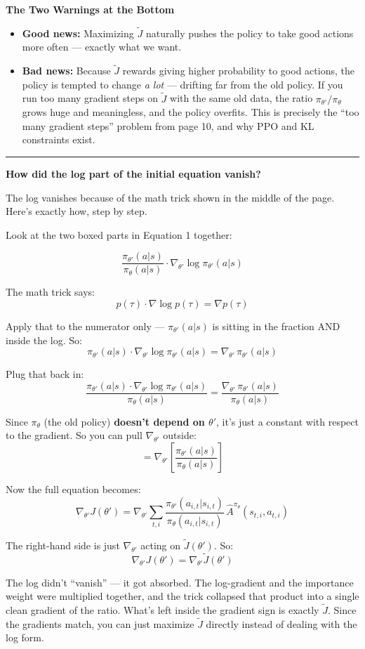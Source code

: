 \bigskip

\textbf{The Two Warnings at the Bottom}
\begin{itemize}
    \item \textbf{Good news:} Maximizing $\tilde{J}$ naturally pushes the policy to take good actions more often --- exactly what we want.
    \item \textbf{Bad news:} Because $\tilde{J}$ rewards giving higher probability to good actions, the policy is tempted to change \textit{a lot} --- drifting far from the old policy. If you run too many gradient steps on $\tilde{J}$ with the same old data, the ratio $\pi_{\theta'}/\pi_\theta$ grows huge and meaningless, and the policy overfits. This is precisely the ``too many gradient steps'' problem from page 10, and why PPO and KL constraints exist.
\end{itemize}

\bigskip
\hrule
\bigskip

\textbf{How did the log part of the initial equation vanish?}

The log vanishes because of the math trick shown in the middle of the page. Here's exactly how,
step by step.

Look at the two boxed parts in Equation 1 together:

\[
\frac{\pi_{\theta'}(a|s)}{\pi_\theta(a|s)} \cdot \nabla_{\theta'} \log \pi_{\theta'}(a|s)
\]

The math trick says:
\[
p(\tau) \cdot \nabla \log p(\tau) = \nabla p(\tau)
\]

Apply that to the numerator only --- $\pi_{\theta'}(a|s)$ is sitting in the fraction AND inside
the log. So:
\[
\pi_{\theta'}(a|s) \cdot \nabla_{\theta'} \log \pi_{\theta'}(a|s) = \nabla_{\theta'}\, \pi_{\theta'}(a|s)
\]

Plug that back in:
\[
\frac{\pi_{\theta'}(a|s) \cdot \nabla_{\theta'} \log \pi_{\theta'}(a|s)}{\pi_\theta(a|s)}
= \frac{\nabla_{\theta'}\, \pi_{\theta'}(a|s)}{\pi_\theta(a|s)}
\]

Since $\pi_\theta$ (the old policy) \textbf{doesn't depend on $\theta'$}, it's just a constant
with respect to the gradient. So you can pull $\nabla_{\theta'}$ outside:
\[
= \nabla_{\theta'} \left[ \frac{\pi_{\theta'}(a|s)}{\pi_\theta(a|s)} \right]
\]

Now the full equation becomes:
\[
\nabla_{\theta'} J(\theta') = \nabla_{\theta'} \sum_{t,i}
\frac{\pi_{\theta'}(a_{i,t}|s_{i,t})}{\pi_\theta(a_{i,t}|s_{i,t})}\,
\hat{A}^{\pi_\theta}(s_{t,i}, a_{t,i})
\]

The right-hand side is just $\nabla_{\theta'}$ acting on $\tilde{J}(\theta')$. So:
\[
\nabla_{\theta'} J(\theta') = \nabla_{\theta'} \tilde{J}(\theta')
\]

The log didn't ``vanish'' --- it got absorbed. The log-gradient and the importance weight were
multiplied together, and the trick collapsed that product into a single clean gradient of the ratio.
What's left inside the gradient sign is exactly $\tilde{J}$. Since the gradients match, you can
just maximize $\tilde{J}$ directly instead of dealing with the log form.